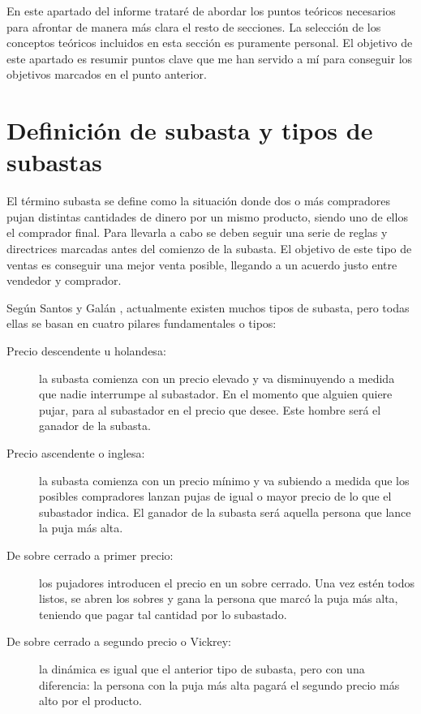 	En este apartado del informe trataré de abordar los puntos teóricos necesarios para afrontar de manera más clara el resto de secciones. La selección de los conceptos teóricos incluidos en esta sección es puramente personal. El objetivo de este apartado es resumir puntos clave que me han servido a mí para conseguir los objetivos marcados en el punto anterior.
	
\section{Definición de subasta y tipos de subastas}

	El término subasta se define como la situación donde dos o más compradores pujan distintas cantidades de dinero por un mismo producto, siendo uno de ellos el comprador final. Para llevarla a cabo se deben seguir una serie de reglas y directrices marcadas antes del comienzo de la subasta. El objetivo de este tipo de ventas es conseguir una mejor venta posible, llegando a un acuerdo justo entre vendedor y comprador.
	
	Según Santos y Galán \cite{apuntes:ecommerce_adwords}, actualmente existen muchos tipos de subasta, pero todas ellas se basan en cuatro pilares fundamentales o tipos:
	
	\begin{description}
		\item[Precio descendente u holandesa:] la subasta comienza con un precio elevado y va disminuyendo a medida que nadie interrumpe al subastador. En el momento que alguien quiere pujar, para al subastador en el precio que desee. Este hombre será el ganador de la subasta.
		\item[Precio ascendente o inglesa:] la subasta comienza con un precio mínimo y va subiendo a medida que los posibles compradores lanzan pujas de igual o mayor precio de lo que el subastador indica. El ganador de la subasta será aquella persona que lance la puja más alta.
		\item[De sobre cerrado a primer precio:] los pujadores introducen el precio en un sobre cerrado. Una vez estén todos listos, se abren los sobres y gana la persona que marcó la puja más alta, teniendo que pagar tal cantidad por lo subastado.
		\item[De sobre cerrado a segundo precio o Vickrey:] la dinámica es igual que el anterior tipo de subasta, pero con una diferencia: la persona con la puja más alta pagará el segundo precio más alto por el producto.
	\end{description}
	
